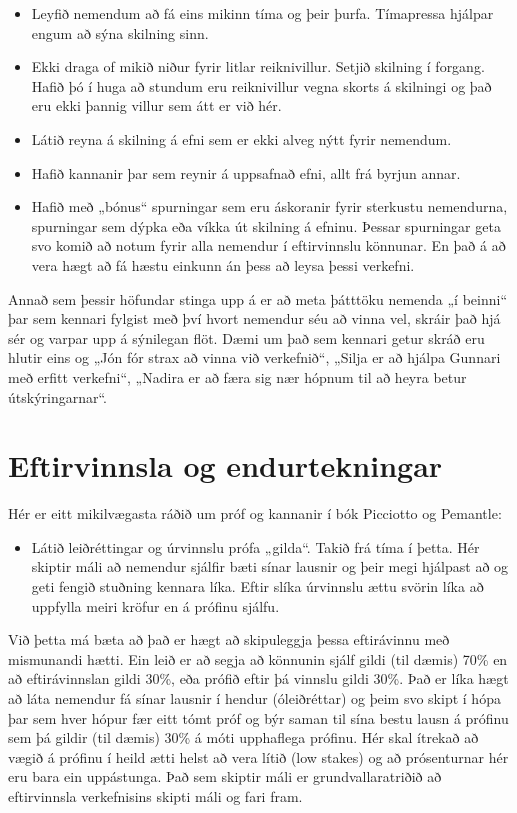 \documentclass[
  icelandic,
]{book}
\providecommand{\tightlist}{%
  \setlength{\itemsep}{0pt}\setlength{\parskip}{0pt}}
\begin{document}
\begin{itemize}
\tightlist
\item
  Leyfið nemendum að fá eins mikinn tíma og þeir þurfa. Tímapressa hjálpar engum að sýna skilning sinn.
\item
  Ekki draga of mikið niður fyrir litlar reiknivillur. Setjið skilning í forgang. Hafið þó í huga að stundum eru reiknivillur vegna skorts á skilningi og það eru ekki þannig villur sem átt er við hér.
\item
  Látið reyna á skilning á efni sem er ekki alveg nýtt fyrir nemendum.
\item
  Hafið kannanir þar sem reynir á uppsafnað efni, allt frá byrjun annar.
\item
  Hafið með „bónus`` spurningar sem eru áskoranir fyrir sterkustu nemendurna, spurningar sem dýpka eða víkka út skilning á efninu. Þessar spurningar geta svo komið að notum fyrir alla nemendur í eftirvinnslu könnunar. En það á að vera hægt að fá hæstu einkunn án þess að leysa þessi verkefni.
\end{itemize}

Annað sem þessir höfundar stinga upp á er að meta þátttöku nemenda „í beinni`` þar sem kennari fylgist með því hvort nemendur séu að vinna vel, skráir það hjá sér og varpar upp á sýnilegan flöt. Dæmi um það sem kennari getur skráð eru hlutir eins og „Jón fór strax að vinna við verkefnið``, „Silja er að hjálpa Gunnari með erfitt verkefni``, „Nadira er að færa sig nær hópnum til að heyra betur útskýringarnar``.

\section{Eftirvinnsla og endurtekningar}\label{eftirvinnsla-og-endurtekningar}

Hér er eitt mikilvægasta ráðið um próf og kannanir í bók Picciotto og Pemantle:

\begin{itemize}
\tightlist
\item
  Látið leiðréttingar og úrvinnslu prófa „gilda``. Takið frá tíma í þetta. Hér skiptir máli að nemendur sjálfir bæti sínar lausnir og þeir megi hjálpast að og geti fengið stuðning kennara líka. Eftir slíka úrvinnslu ættu svörin líka að uppfylla meiri kröfur en á prófinu sjálfu.
\end{itemize}

Við þetta má bæta að það er hægt að skipuleggja þessa eftirávinnu með mismunandi hætti. Ein leið er að segja að könnunin sjálf gildi (til dæmis) 70\% en að eftirávinnslan gildi 30\%, eða prófið eftir þá vinnslu gildi 30\%. Það er líka hægt að láta nemendur fá sínar lausnir í hendur (óleiðréttar) og þeim svo skipt í hópa þar sem hver hópur fær eitt tómt próf og býr saman til sína bestu lausn á prófinu sem þá gildir (til dæmis) 30\% á móti upphaflega prófinu. Hér skal ítrekað að vægið á prófinu í heild ætti helst að vera lítið (low stakes) og að prósenturnar hér eru bara ein uppástunga. Það sem skiptir máli er grundvallaratriðið að eftirvinnsla verkefnisins skipti máli og fari fram.
\end{document}
